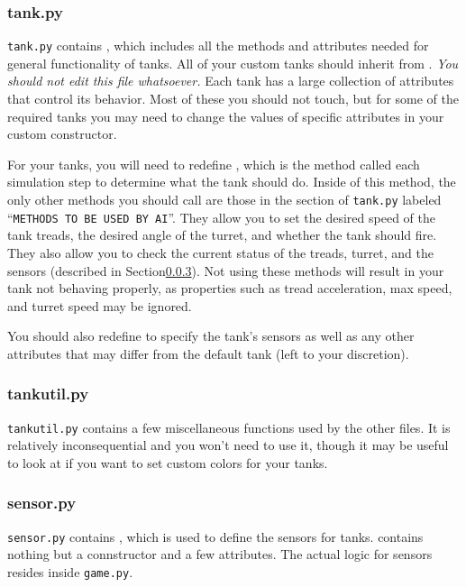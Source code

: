 \documentclass[11pt]{cselabheader}
\begin{document}
\subsubsection{tank.py}
\texttt{tank.py} contains , which includes all the
methods and attributes needed for general functionality of tanks. All of your
custom tanks should inherit from . \emph{You should not edit
this file whatsoever.} Each tank has a large collection of attributes that
control its behavior. Most of these you should not touch, but for some of the
required tanks you may need to change the values of specific attributes in
your custom constructor.

For your tanks, you will need to redefine
, which is the method called each simulation step
to determine what the tank should do. Inside of this method, the only other
methods you should call are those in the section of \texttt{tank.py} labeled
``\texttt{METHODS TO BE USED BY AI}''. They allow you to set the desired speed
of the tank treads, the desired angle of the turret, and whether the tank should
fire. They also allow you to check the current status of the treads, turret, and
the sensors (described in Section\ref{subsubsec:sensor}). Not using these
methods will result in your tank not behaving properly, as properties such as
tread acceleration, max speed, and turret speed may be ignored.

You should also redefine  to specify the tank's sensors as
well as any other attributes that may differ from the default tank (left to your
discretion).

\subsubsection{tankutil.py}
\texttt{tankutil.py} contains a few miscellaneous functions used by the other
files. It is relatively inconsequential and you won't need to use it, though it
may be useful to look at if you want to set custom colors for your tanks.

\subsubsection{sensor.py}
\label{subsubsec:sensor}
\texttt{sensor.py} contains , which is used to define
the sensors for tanks.  contains nothing but a connstructor
and a few attributes. The actual logic for sensors resides inside
\texttt{game.py}.
\end{document}
